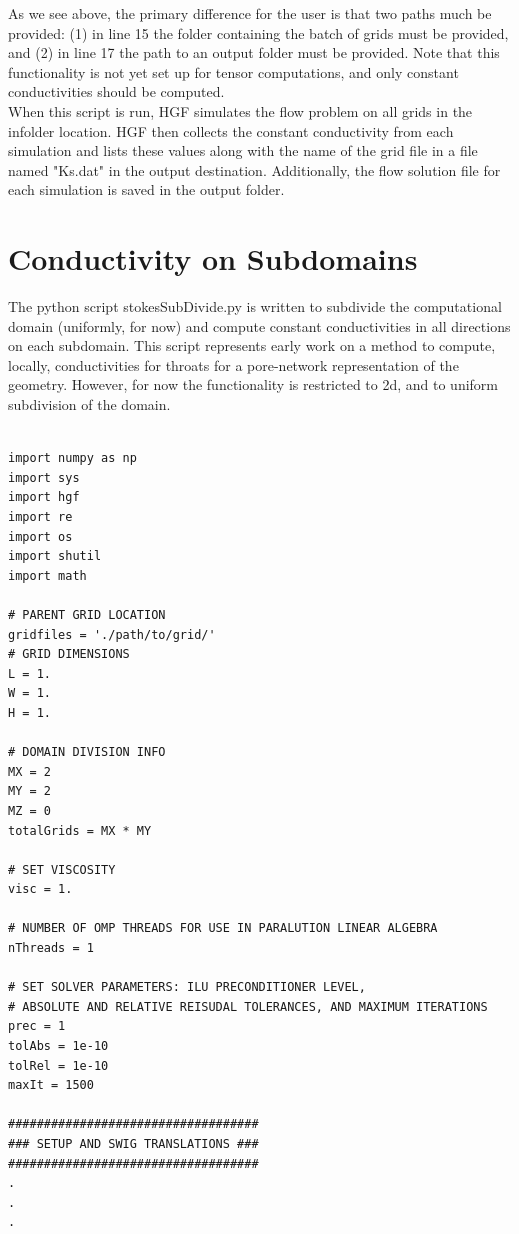 \documentclass{report}
\begin{document}
\noindent As we see above, the primary difference for the user is that
two paths much be provided: (1) in line 15 the folder containing
the batch of grids must be provided, and (2) in line 17 the
path to an output folder must be provided. Note that this functionality
is not yet set up for tensor computations, and only constant conductivities
should be computed.\\

\noindent When this script is run, HGF simulates the flow problem
on all grids in the infolder location. HGF then collects the
constant conductivity from each simulation and lists these values along
with the name of the grid file in a file named "Ks.dat" in the output
destination. Additionally, the flow solution file for each simulation is
saved in the output folder.

\section{Conductivity on Subdomains}

\noindent The python script stokesSubDivide.py is written to subdivide
the computational domain (uniformly, for now) and compute constant
conductivities in all directions on each subdomain. This script
represents early work on a method to compute, locally, conductivities
for throats for a pore-network representation of the geometry. However,
for now the functionality is restricted to 2d, and to uniform subdivision
of the domain.

\begin{lstlisting}

import numpy as np
import sys
import hgf
import re
import os
import shutil
import math

# PARENT GRID LOCATION
gridfiles = './path/to/grid/'
# GRID DIMENSIONS
L = 1.
W = 1.
H = 1.

# DOMAIN DIVISION INFO
MX = 2
MY = 2
MZ = 0
totalGrids = MX * MY

# SET VISCOSITY
visc = 1.

# NUMBER OF OMP THREADS FOR USE IN PARALUTION LINEAR ALGEBRA
nThreads = 1

# SET SOLVER PARAMETERS: ILU PRECONDITIONER LEVEL,
# ABSOLUTE AND RELATIVE REISUDAL TOLERANCES, AND MAXIMUM ITERATIONS
prec = 1
tolAbs = 1e-10
tolRel = 1e-10
maxIt = 1500

###################################
### SETUP AND SWIG TRANSLATIONS ###
###################################
.
.
.
\end{lstlisting}
\end{document}
